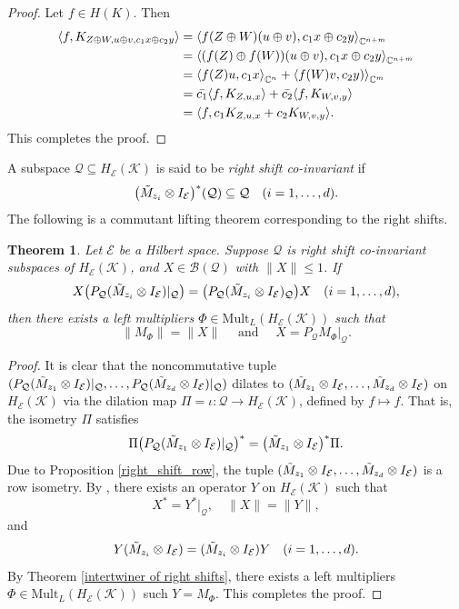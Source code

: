 \documentclass[12pt]{amsart}%
\newtheorem{theorem}{Theorem}[section]
\numberwithin{equation}{section}
\newcommand{\clb}{\mathcal{B}}
\newcommand{\cle}{\mathcal{E}}
\newcommand{\clk}{\mathcal{K}}
\newcommand{\clq}{\mathcal{Q}}
\newcommand{\C}{\mathbb{C}}
\newcommand\la{{\langle }}
\newcommand\ra{{\rangle}}
\begin{document}
\begin{proof}
Let $f\in H(K)$. Then
\begingroup
 \allowdisplaybreaks
\begin{align*}
\la f, K_{ Z\oplus W, u\oplus v, c_1x\oplus c_2y} \ra&=\la f(Z\oplus W)(u\oplus v), c_1x\oplus c_2y\ra_{\C^{n+m}}\\
&=\la (f(Z)\oplus  f(W))(u\oplus v), c_1x\oplus c_2y\ra_{\C^{n+m}}\\
&=\la f(Z) u, c_1x\ra_{\C^n} +   \la f(W) v,c_2y)\ra_{\C^{m}}\\
&=\Bar{c_1}\la f, K_{Z, u,x} \ra + \Bar{c_2}\la f,  K_{W, v, y}\ra\\
&=\la f, c_1K_{Z, u,x} + c_2K_{W, v, y}\ra.
\end{align*}
\endgroup
This completes the proof.
\end{proof}

A subspace $\clq\subseteq H_\cle(\clk)$ is said to be \textit{right shift co-invariant} if
\[\big (\Tilde{M}_{z_i}\otimes I_{\cle}\big)^*(\clq)\subseteq \clq \quad (i=1,\ldots, d).\]
 The following is a commutant lifting theorem corresponding to the right shifts.

\begin{theorem}\label{commutant_lifting theorem}
Let $\cle$ be a Hilbert space. Suppose $\clq$ is right shift co-invariant subspaces of $H_\cle(\clk)$, and $X\in \clb(\clq)$ with $\|X\|\leq 1$. If
\[X \big (P_{\clq} (\Tilde{M}_{z_i} \otimes I_{\cle})|_{\clq}\big)= \big(P_{\clq}(\Tilde{M}_{z_i} \otimes I_{\cle})_{\clq}\big) X \quad (i=1, \ldots, d),\]
then there exists a left multipliers $\Phi\in \text{Mult}_L(H_\cle(\clk))$ such that
\[\|M_\Phi\|=\|X\| \quad \text{ and }\quad X=P_{\clq} M_\Phi|_{\clq}.\]
\end{theorem}

\begin{proof}
It is clear that the noncommutative tuple $(P_{\clq} (\Tilde{M}_{z_1} \otimes I_{\cle})|_{\clq}, \ldots, P_{\clq} (\Tilde{M}_{z_d} \otimes I_{\cle})|_{\clq})$ dilates to $(\Tilde{M}_{z_1}\otimes I_{\cle}, \ldots, \Tilde{M}_{z_d}\otimes I_{\cle})$ on $H_{\cle}(\clk)$ via the dilation map $\Pi=\iota:\clq \to H_\cle(\clk)$, defined by $f\mapsto f$. That is, the isometry $\Pi$ satisfies 
\[
\Pi \big(P_{\clq} (\Tilde{M}_{z_1} \otimes I_{\cle})|_{\clq}\big )^*= \big(\Tilde{M}_{z_1} \otimes I_{\cle}\big )^*\Pi.  
\]
Due to Proposition \ref{right_shift_row}, the tuple $(\Tilde{M}_{z_1}\otimes I_{\cle}, \ldots, \Tilde{M}_{z_d}\otimes I_{\cle})$ is a row isometry. By \cite[Theorem 3.2]{P89}, there exists an operator $Y$ on $H_{\cle}(\clk)$ such that 
\[ X^*=Y^*|_{\clq},  \quad \|X\|=\|Y\|,\]
and 
\[Y  (\Tilde{M}_{z_i} \otimes I_{\cle})= (\Tilde{M}_{z_i} \otimes I_{\cle}) Y \quad (i=1, \ldots, d).\]
By Theorem \ref{intertwiner of right shifts}, there exists a left multipliers $\Phi\in \text{Mult}_L(H_\cle(\clk))$ such $Y=M_{\Phi}$. This completes the proof.
\end{proof}
\end{document}
